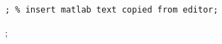 \checkmark

%
%


\usepackage{ulem}
%





\usepackage{pdfpages}


\usepackage{listings} %
\usepackage[framed,numbered]{mcode} %
\lstset{language=matlab, numbers=left, numberstyle=\tiny, frame=single} %
\begin{lstlisting}; % insert matlab text copied from editor;
\end{lstlisting};





